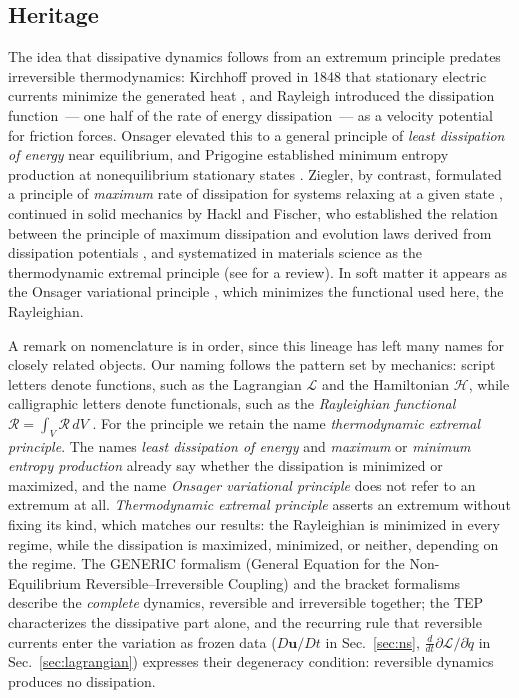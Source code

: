 \documentclass[aip,pof,reprint,amsmath,amssymb,longbibliography]{revtex4-2}
\begin{document}
\subsection{Heritage}
\label{sec:heritage}

The idea that dissipative dynamics follows from an extremum principle predates irreversible thermodynamics: Kirchhoff proved in 1848 that stationary electric currents minimize the generated heat \cite{kirchhoff1848}, and Rayleigh \cite{rayleigh1873} introduced the dissipation function~--- one half of the rate of energy dissipation~--- as a velocity potential for friction forces. Onsager \cite{onsager1931reciprocal} elevated this to a general principle of \textit{least dissipation of energy} near equilibrium, and Prigogine established minimum entropy production at nonequilibrium stationary states \cite{kondepudi2014modern}. Ziegler, by contrast, formulated a principle of \textit{maximum} rate of dissipation for systems relaxing at a given state \cite{ziegler1963}, continued in solid mechanics by Hackl and Fischer, who established the relation between the principle of maximum dissipation and evolution laws derived from dissipation potentials \cite{hackl2008}, and systematized in materials science as the thermodynamic extremal principle \cite{svoboda2005application, fischer2014review, emmerich2003diffuse} (see \cite{martyushev2006} for a review). In soft matter it appears as the Onsager variational principle \cite{doi2011}, which minimizes the functional used here, the Rayleighian.

A remark on nomenclature is in order, since this lineage has left many names for closely related objects. Our naming follows the pattern set by mechanics: script letters denote functions, such as the Lagrangian $\mathscr{L}$ and the Hamiltonian $\mathscr{H}$, while calligraphic letters denote functionals, such as the \textit{Rayleighian functional} $\mathcal{R} = \int_V \mathscr{R}\, dV$ \cite{doi2011, beris2024}. For the principle we retain the name \textit{thermodynamic extremal principle}. The names \textit{least dissipation of energy} and \textit{maximum} or \textit{minimum entropy production} already say whether the dissipation is minimized or maximized, and the name \textit{Onsager variational principle} does not refer to an extremum at all. \textit{Thermodynamic extremal principle} asserts an extremum without fixing its kind, which matches our results: the Rayleighian is minimized in every regime, while the dissipation is maximized, minimized, or neither, depending on the regime. The GENERIC formalism (General Equation for the Non-Equilibrium Reversible--Irreversible Coupling) and the bracket formalisms \cite{grmela1997, ottinger1997, beris2024} describe the \textit{complete} dynamics, reversible and irreversible together; the TEP characterizes the dissipative part alone, and the recurring rule that reversible currents enter the variation as frozen data ($D\boldsymbol{u}/Dt$ in Sec.~\ref{sec:ns}, $\tfrac{d}{dt}\partial \mathscr{L}/\partial \dot{q}$ in Sec.~\ref{sec:lagrangian}) expresses their degeneracy condition: reversible dynamics produces no dissipation.
\end{document}

